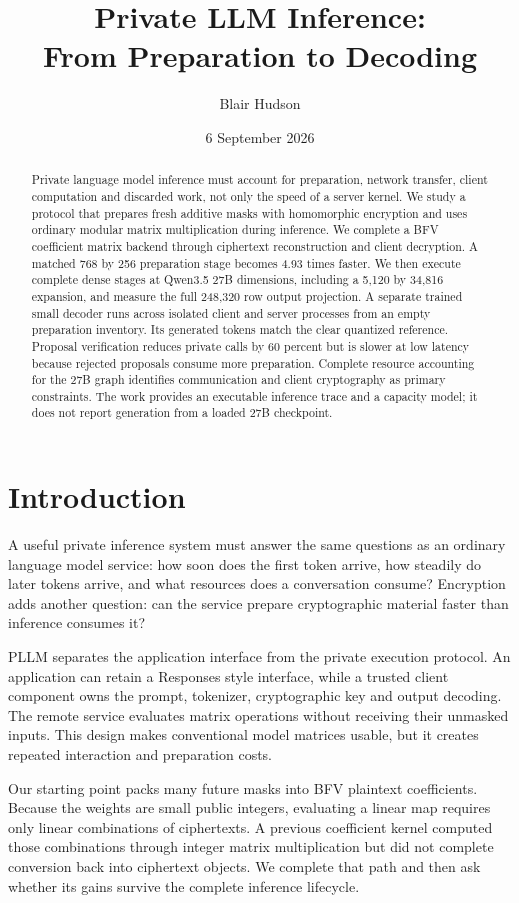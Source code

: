 \documentclass[10pt,twocolumn]{article}
\title{Private LLM Inference:\\From Preparation to Decoding}
\author{Blair Hudson}
\date{6 September 2026}
\begin{document}
\maketitle
\begin{abstract}
Private language model inference must account for preparation, network transfer,
client computation and discarded work, not only the speed of a server kernel.
We study a protocol that prepares fresh additive masks with homomorphic
encryption and uses ordinary modular matrix multiplication during inference.
We complete a BFV coefficient matrix backend through ciphertext reconstruction
and client decryption. A matched 768 by 256 preparation stage becomes 4.93
times faster. We then execute complete dense stages at Qwen3.5 27B dimensions,
including a 5,120 by 34,816 expansion, and measure the full 248,320 row output
projection. A separate trained small decoder runs across isolated client and
server processes from an empty preparation inventory. Its generated tokens
match the clear quantized reference. Proposal verification reduces private
calls by 60 percent but is slower at low latency because rejected proposals
consume more preparation. Complete resource accounting for the 27B graph
identifies communication and client cryptography as primary constraints.
The work provides an executable inference trace and a capacity model; it does
not report generation from a loaded 27B checkpoint.
\end{abstract}

\section{Introduction}
A useful private inference system must answer the same questions as an ordinary
language model service: how soon does the first token arrive, how steadily do
later tokens arrive, and what resources does a conversation consume? Encryption
adds another question: can the service prepare cryptographic material faster
than inference consumes it?

PLLM separates the application interface from the private execution protocol.
An application can retain a Responses style interface, while a trusted client
component owns the prompt, tokenizer, cryptographic key and output decoding.
The remote service evaluates matrix operations without receiving their
unmasked inputs. This design makes conventional model matrices usable, but it
creates repeated interaction and preparation costs.

Our starting point packs many future masks into BFV plaintext coefficients.
Because the weights are small public integers, evaluating a linear map requires
only linear combinations of ciphertexts. A previous coefficient kernel computed
those combinations through integer matrix multiplication but did not complete
conversion back into ciphertext objects. We complete that path and then ask
whether its gains survive the complete inference lifecycle.
\end{document}
